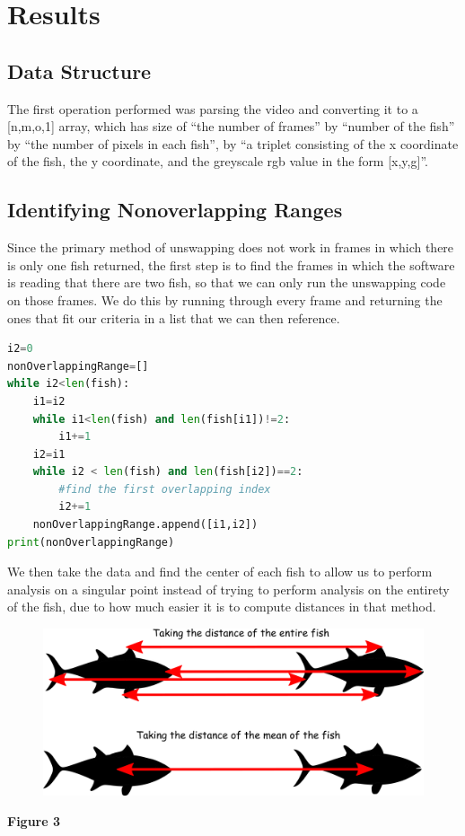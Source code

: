 \documentclass[12pt]{article}
\begin{document}
\section{Results}

\subsection{Data Structure}
The first operation performed was parsing the video and converting it to a [n,m,o,1] array, which has size of ``the number of frames'' by ``number of the fish'' by ``the number of pixels in each fish'', by ``a triplet consisting of the x coordinate of the fish, the y coordinate, and the greyscale rgb value in the form [x,y,g]''. 

\subsection{Identifying Nonoverlapping Ranges}

Since the primary method of unswapping does not work in frames in which there is only one fish returned, the first step is to find the frames in which the software is reading that there are two fish, so that we can only run the unswapping code on those frames. We do this by running through every frame and returning the ones that fit our criteria in a list that we can then reference.

\begin{minipage}[c]{\textwidth}
\begin{lstlisting}[language=Python]
i2=0
nonOverlappingRange=[]
while i2<len(fish):
    i1=i2
    while i1<len(fish) and len(fish[i1])!=2:
        i1+=1
    i2=i1
    while i2 < len(fish) and len(fish[i2])==2:
        #find the first overlapping index
        i2+=1
    nonOverlappingRange.append([i1,i2])
print(nonOverlappingRange)
\end{lstlisting}
\end{minipage}

We then take the data and find the center of each fish to allow us to perform analysis on a singular point instead of trying to perform analysis on the entirety of the fish, due to how much easier it is to compute distances in that method. 
\begin{figure}[h] 
	\centering
	\includegraphics[width=.5\textwidth]{fish3}
	\caption{}
\end{figure}\textbf{Figure 3}
\end{document}
